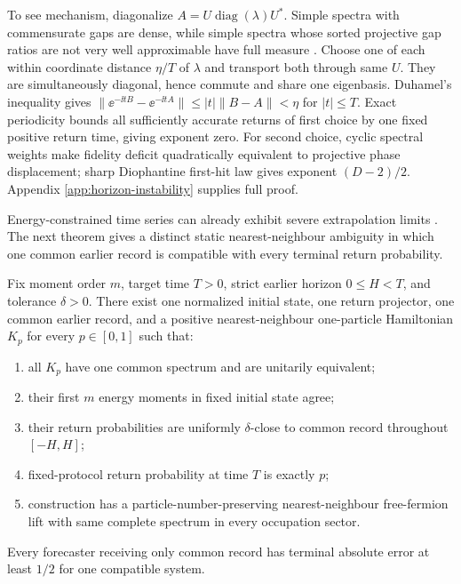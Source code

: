 To see mechanism, diagonalize $A=U\operatorname{diag}(\lambda)U^*$.  Simple
spectra with commensurate gaps are dense, while simple spectra whose sorted
projective gap ratios are not very well approximable have full measure
\cite{KleinbockMargulis1998}.  Choose one of each within coordinate distance
$\eta/T$ of $\lambda$ and transport both through same $U$.  They are
simultaneously diagonal, hence commute and share one eigenbasis.  Duhamel's
inequality gives
$\|\ee^{-\ii tB}-\ee^{-\ii tA}\|\le |t|\|B-A\|<\eta$
for $|t|\le T$.  Exact periodicity bounds all sufficiently accurate returns
of first choice by one fixed positive return time, giving exponent zero.
For second choice, cyclic spectral weights make fidelity deficit
quadratically equivalent to projective phase displacement; sharp
Diophantine first-hit law gives exponent $(D-2)/2$.  Appendix
\ref{app:horizon-instability} supplies full proof.

Energy-constrained time series can already exhibit severe extrapolation
limits \cite{ManosWeilenmannNavascues2025}.  The next theorem gives a distinct
static nearest-neighbour ambiguity in which one common earlier record is
compatible with every terminal return probability.

\begin{theorem}
\label{thm:ambiguity}
Fix moment order $m$, target time $T>0$, strict earlier horizon
$0\le H<T$, and tolerance $\delta>0$.  There exist one normalized initial
state, one return projector, one common earlier record, and a positive
nearest-neighbour one-particle Hamiltonian $K_p$ for every $p\in[0,1]$ such
that:
\begin{enumerate}[leftmargin=1.55em]
\item all $K_p$ have one common spectrum and are unitarily equivalent;
\item their first $m$ energy moments in fixed initial state agree;
\item their return probabilities are uniformly $\delta$-close to common
      record throughout $[-H,H]$;
\item fixed-protocol return probability at time $T$ is exactly $p$;
\item construction has a particle-number-preserving nearest-neighbour
      free-fermion lift with same complete spectrum in every occupation
      sector.
\end{enumerate}
Every forecaster receiving only common record has terminal absolute error at
least $1/2$ for one compatible system.
\end{theorem}

